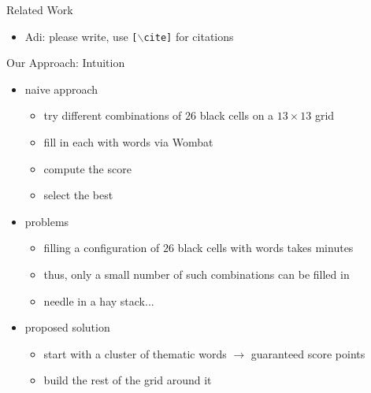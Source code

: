 \documentclass[aspectratio=169,usenames,dvipsnames]{beamer}
\newcommand{\tcb}[1]{\textcolor{m1}{#1}}
\newcommand{\tcg}[1]{\textcolor{m5}{#1}}
\newcommand{\tcm}[1]{\textcolor{m7}{#1}}
\newcommand{\bei}{\begin{itemize}}
\newcommand{\eei}{\end{itemize}}
\newcommand{\ie}{\item}
\numberwithin{equation}{section}
\numberwithin{theorem}{section}
\numberwithin{lem}{section}
\numberwithin{df}{section}
\begin{document}

\begin{frame}{Related Work}

\bei

\ie \tcm{Adi: please write, use {\tt [$\backslash$cite]} for citations}

\eei

\end{frame}


\begin{frame}{Our Approach: Intuition}

\bei

\ie \tcb{naive approach} 
\bei 
\ie try different combinations of $26$ black cells on a $13 \times 13$ grid
\ie fill in each with words via {\sc Wombat}
\ie compute the score
\ie select the best
\eei

\bigskip

\ie \tcm{problems}
\bei
\ie filling a configuration of $26$ black cells with words takes minutes
\ie thus, only a small number of such combinations can be filled in
\ie needle in a hay stack...
\eei

\bigskip

\ie \tcg{proposed solution}
\bei
\ie start with a cluster of thematic words $\to$ guaranteed score points
\ie build the rest of the grid around it
\eei

\eei

\end{frame}




\end{document}
